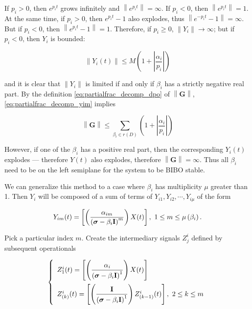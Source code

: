 	If $p_i > 0$, then $e^{p_it}$ grows infinitely and $\left\lVert e^{p_it} \right\rVert = \infty$. If $p_i < 0$, then $\left\lVert e^{p_it} \right\rVert = 1$. At the same time, if $p_i > 0$, then $e^{p_it} - 1$ also explodes, thus $\left\lVert e^{-p_it} - 1 \right\rVert = \infty$. But if $p_i < 0$, then $\left\lVert e^{p_it} - 1\right\rVert = 1$. Therefore, if $p_i \geq 0$, $\left\lVert Y_i\right\rVert\to\infty$; but if $p_i < 0$, then $Y_i$ is bounded:

\begin{equation} \left\lVert Y_i(t) \right\lVert \leq M \left( 1 + \left\lvert \dfrac{\alpha_i}{p_i}\right\rvert \right) \label{eq:partialfrac_decomp_yim}\end{equation}

	\noindent and it is clear that $\left\lVert Y_i\right\rVert$ is limited if and only if $\beta_i$ has a strictly negative real part. By the definition \eqref{eq:partialfrac_decomp_dpo} of $\left\lVert \mathbf{G}\right\rVert$, \eqref{eq:partialfrac_decomp_yim} implies

\begin{equation} \left\lVert\mathbf{G}\right\rVert \leq \sum\limits_{\beta_i\in r\left(D\right)}\left( 1 + \left\lvert \dfrac{\alpha_i}{p_i}\right\rvert \right)\end{equation}

	However, if one of the $\beta_i$ has a positive real part, then the corresponding $Y_i(t)$ explodes — therefore $Y(t)$ also explodes, therefore $\left\lVert \mathbf{G}\right\rVert = \infty$. Thus all $\beta_i$ need to be on the left semiplane for the system to be BIBO stable.

	We can generalize this method to a case where $\beta_i$ has multiplicity $\mu$  greater than 1. Then $Y_i$ will be composed of a sum of terms of $Y_{i1},Y_{i2},\cdots,Y_{i\mu}$ of the form

\begin{equation} Y_{im}(t) = \left[\left(\dfrac{\alpha_{im}}{\left(\boldsymbol{\sigma} - \beta_i\mathbf{I}\right)^m}\right) X(t)\right],\ 1\leq m \leq \mu\left(\beta_i\right). \label{eq:partialfrac_decomp_dpo_mth}\end{equation}
	
	Pick a particular index $m$. Create the intermediary signals $Z_j^i$ defined by subsequent operationals

\begin{equation} \left\{\begin{array}{l}
	Z^i_1(t) = \left[\left(\dfrac{\alpha_{i}}{\left(\boldsymbol{\sigma} - \beta_i\mathbf{I}\right)^1}\right) X(t)\right] \\[5mm] 
	Z^i_{(k)}(t) = \left[\left(\dfrac{\mathbf{I}}{\left(\boldsymbol{\sigma} - \beta_i\mathbf{I}\right)^1}\right) Z^i_{(k-1)}(t)\right],\ 2\leq k \leq m
\end{array}\right.
\end{equation}

